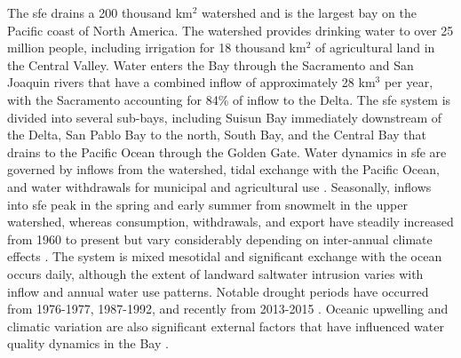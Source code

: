\documentclass[journal = esthag, manuscript = article]{achemso}\usepackage[]{graphicx}\usepackage[]{color}
\begin{document}
The \ac{sfe} drains a 200 thousand km$^2$ watershed and is the largest bay on the Pacific coast of North America.  The watershed provides drinking water to over 25 million people, including irrigation for 18 thousand km$^2$ of agricultural land in the Central Valley.  Water enters the Bay through the Sacramento and San Joaquin rivers that have a combined inflow of approximately 28 km$^3$ per year, with the Sacramento accounting for 84\% of inflow to the Delta.  The \ac{sfe} system is divided into several sub-bays, including Suisun Bay immediately downstream of the Delta, San Pablo Bay to the north, South Bay, and the Central Bay that drains to the Pacific Ocean through the Golden Gate.  Water dynamics in \ac{sfe} are governed by inflows from the watershed, tidal exchange with the Pacific Ocean, and water withdrawals for municipal and agricultural use \cite{Jassby00}.  Seasonally, inflows into \ac{sfe} peak in the spring and early summer from snowmelt in the upper watershed, whereas consumption, withdrawals, and export have steadily increased from 1960 to present but vary considerably depending on inter-annual climate effects \cite{Cloern12b}.  The system is mixed mesotidal and significant exchange with the ocean occurs daily, although the extent of landward saltwater intrusion varies with inflow and annual water use patterns. Notable drought periods have occurred from 1976-1977, 1987-1992, and recently from 2013-2015 \cite{Cloern15}.  Oceanic upwelling and climatic variation are also significant external factors that have influenced water quality dynamics in the Bay \cite{Cloern07}.
\end{document}
